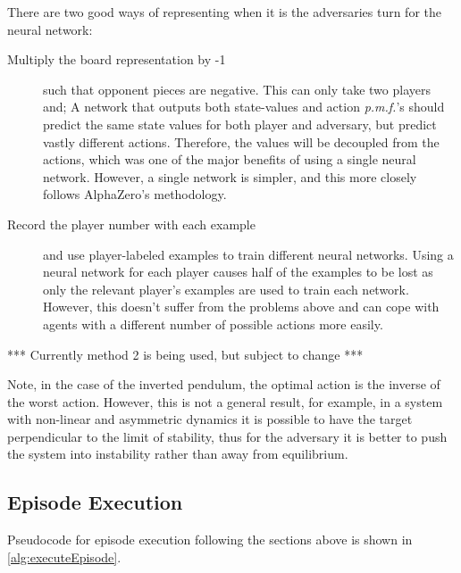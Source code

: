 \documentclass[../main.tex]{subfiles}
\begin{document}
There are two good ways of representing when it is the adversaries turn for the neural network: 
\begin{description}
   \item[Multiply the board representation by -1] such that opponent pieces are negative. This can only take two players and; A network that outputs both state-values and action \textit{p.m.f.}'s should predict the same state values for both player and adversary, but predict vastly different actions. Therefore, the values will be decoupled from the actions, which was one of the major benefits of using a single neural network. However, a single network is simpler, and this more closely follows AlphaZero's methodology.

   \item[Record the player number with each example] and use player-labeled examples to train different neural networks. Using a neural network for each player causes half of the examples to be lost as only the relevant player's examples are used to train each network. However, this doesn't suffer from the problems above and can cope with agents with a different number of possible actions more easily.
\end{description}

*** Currently method 2 is being used, but subject to change ***

Note, in the case of the inverted pendulum, the optimal action is the inverse of the worst action. However, this is not a general result, for example, in a system with non-linear and asymmetric dynamics it is possible to have the target perpendicular to the limit of stability, thus for the adversary it is better to push the system into instability rather than away from equilibrium.

\subsection{Episode Execution}

Pseudocode for episode execution following the sections above is shown in \cref{alg:executeEpisode}.
\end{document}
